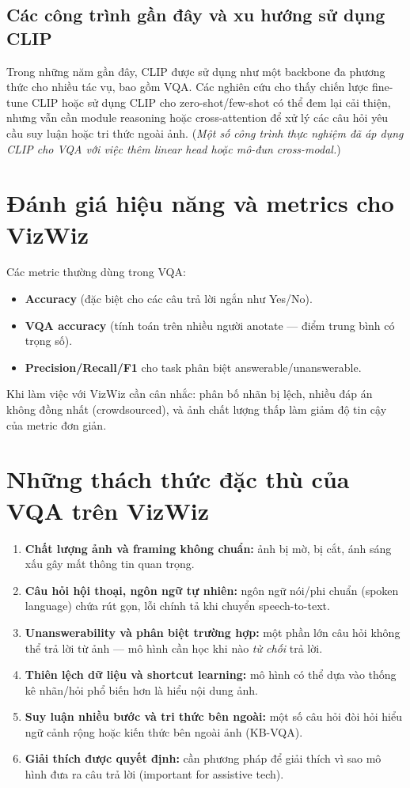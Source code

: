 \subsection{Các công trình gần đây và xu hướng sử dụng CLIP}
Trong những năm gần đây, CLIP được sử dụng như một backbone đa phương thức cho nhiều tác vụ, bao gồm VQA. Các nghiên cứu cho thấy chiến lược fine-tune CLIP hoặc sử dụng CLIP cho zero-shot/few-shot có thể đem lại cải thiện, nhưng vẫn cần module reasoning hoặc cross-attention để xử lý các câu hỏi yêu cầu suy luận hoặc tri thức ngoài ảnh. (\emph{Một số công trình thực nghiệm đã áp dụng CLIP cho VQA với việc thêm linear head hoặc mô-đun cross-modal.})

\section{Đánh giá hiệu năng và metrics cho VizWiz}
Các metric thường dùng trong VQA:
\begin{itemize}
    \item \textbf{Accuracy} (đặc biệt cho các câu trả lời ngắn như Yes/No).
    \item \textbf{VQA accuracy} (tính toán trên nhiều người anotate — điểm trung bình có trọng số).
    \item \textbf{Precision/Recall/F1} cho task phân biệt answerable/unanswerable.
\end{itemize}
Khi làm việc với VizWiz cần cân nhắc: phân bố nhãn bị lệch, nhiều đáp án không đồng nhất (crowdsourced), và ảnh chất lượng thấp làm giảm độ tin cậy của metric đơn giản.

\section{Những thách thức đặc thù của VQA trên VizWiz}
\begin{enumerate}
    \item \textbf{Chất lượng ảnh và framing không chuẩn:} ảnh bị mờ, bị cắt, ánh sáng xấu gây mất thông tin quan trọng.
    \item \textbf{Câu hỏi hội thoại, ngôn ngữ tự nhiên:} ngôn ngữ nói/phi chuẩn (spoken language) chứa rút gọn, lỗi chính tả khi chuyển speech-to-text.
    \item \textbf{Unanswerability và phân biệt trường hợp:} một phần lớn câu hỏi không thể trả lời từ ảnh — mô hình cần học khi nào \emph{từ chối} trả lời.
    \item \textbf{Thiên lệch dữ liệu và shortcut learning:} mô hình có thể dựa vào thống kê nhãn/hỏi phổ biến hơn là hiểu nội dung ảnh.
    \item \textbf{Suy luận nhiều bước và tri thức bên ngoài:} một số câu hỏi đòi hỏi hiểu ngữ cảnh rộng hoặc kiến thức bên ngoài ảnh (KB-VQA).
    \item \textbf{Giải thích được quyết định:} cần phương pháp để giải thích vì sao mô hình đưa ra câu trả lời (important for assistive tech).
\end{enumerate}

